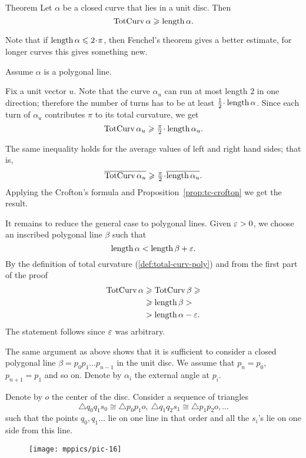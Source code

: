 \begin{thm}{Theorem}\label{thm:DNA}
Let $\alpha$ be a closed curve that lies in a unit disc.
Then 
\[\mathop{\rm TotCurv}\nolimits\alpha\geqslant \mathop{\rm length}\nolimits\alpha.\]
\end{thm}

Note that if $\length\alpha\le2\cdot\pi$, then Fenchel's theorem gives a better estimate,
for longer curves this gives something new.

Assume $\alpha$ is a polygonal line.

Fix a unit vector $u$.
Note that the curve $\alpha_u$ can run at most length 2 in one direction;
therefore the number of turns has to be at least $\tfrac12\cdot\length\alpha$.
Since each turn of $\alpha_u$ contributes $\pi$ to its total curvature, we get
\[\tc\alpha_u\ge \tfrac\pi2\cdot\length\alpha_u.\]

The same inequality holds for the average values of left and right hand sides;
that is,
\[\overline{\tc\alpha_u}
\ge \tfrac\pi2\cdot\overline{\length\alpha_u}.\]
Applying the Crofton's formula and Proposition~\ref{prop:tc-crofton} we get the result.

It remains to reduce the general case to polygonal lines. 
Given $\varepsilon>0$, we choose an inscribed polygonal line $\beta$ such that 
\[\mathop{\rm length}\nolimits \alpha<\mathop{\rm length}\nolimits \beta+\varepsilon.\]
By the definition of total curvature (\ref{def:total-curv-poly}) and from the first part of the proof
\begin{align*}
\mathop{\rm TotCurv}\nolimits\alpha&\geqslant\mathop{\rm TotCurv}\nolimits\beta\geqslant
\\
&\geqslant \mathop{\rm length}\nolimits\beta>
\\
&>\mathop{\rm length}\nolimits\alpha-\varepsilon.
\end{align*}
The statement follows since $\varepsilon$ was arbitrary. 
\qeds

The same argument as above shows that it is sufficient to consider a closed polygonal line $\beta=p_0p_1\dots p_{n-1}$ in the unit disc.
We assume that $p_n=p_0$, $p_{n+1}=p_1$ and so on.
Denote by $\alpha_i$ the external angle at $p_i$.

Denote by $o$ the center of the disc.
Consider a sequence of triangles 
\[\triangle q_0q_1s_0\cong \triangle p_0p_1o,\ \triangle q_1q_2s_1\cong \triangle p_1p_2o,\dots\]
such that the points $q_0,q_1\dots$ lie on one line in that order and all the $s_i$'s lie on one side from this line.

\begin{figure}[h]
\vskip-0mm
\centering
\texttt{[image: mppics/pic-16]}
\vskip0mm
\end{figure}

